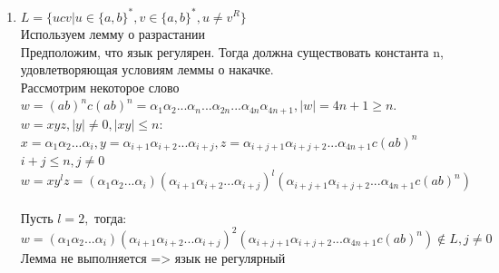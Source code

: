 \documentclass[a4paper]{article}
\begin{document}
\begin{enumerate}
\item $L = \{ ucv  | u \in \{a,b\}^*, v \in \{a,b\}^* , u \ne v^R\} $
\\ Используем лемму о разрастании\\
Предположим, что язык регулярен. Тогда должна существовать константа n, удовлетворяющая условиям леммы о накачке.\\ Рассмотрим некоторое слово
\\$w =(ab)^nc(ab)^n = \alpha_1 \alpha_2 ... \alpha_n...\alpha_{2n}...\alpha_{4n}\alpha_{4n+1}, |w| = 4n+1 \ge n.$\\
$w = xyz, |y| \ne 0, |xy| \le n:$\\
$x = \alpha_1 \alpha_2...\alpha_i, y = \alpha_{i+1} \alpha_{i+2}...\alpha_{i+j}, z = \alpha_{i+j+1}\alpha_{i+j+2}...\alpha_{4n+1}c(ab)^n$\\
$i + j \le n, j \ne 0 $\\
$w = xy^lz=(\alpha_1 \alpha_2...\alpha_i)(\alpha_{i+1} \alpha_{i+2}...\alpha_{i+j})^l(\alpha_{i+j+1}\alpha_{i+j+2}...\alpha_{4n+1}c(ab)^n)$\\
\\
Пусть $l=2,$ тогда: $w = (\alpha_1 \alpha_2...\alpha_i)(\alpha_{i+1} \alpha_{i+2}...\alpha_{i+j})^2(\alpha_{i+j+1}\alpha_{i+j+2}...\alpha_{4n+1}c(ab)^n) \notin L  ,j \ne 0$\\
Лемма не выполняется => язык не регулярный\\


\end{enumerate}
\newpage
\end{document}
